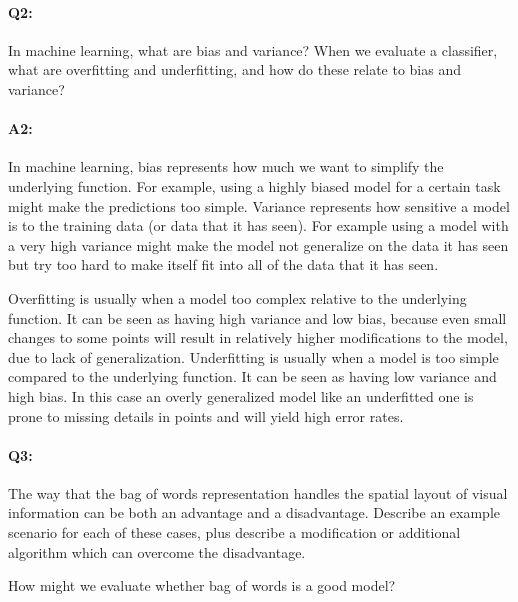 
\pagebreak
\paragraph{Q2:} In machine learning, what are bias and variance? When we evaluate a classifier, what are overfitting and underfitting, and how do these relate to bias and variance?

\paragraph{A2:} In machine learning, bias represents how much we want to simplify the underlying function. For example, using a highly biased model for a certain task might make the predictions too simple. Variance represents how sensitive a model is to the training data (or data that it has seen). For example using a model with a very high variance might make the model not generalize on the data it has seen but try too hard to make itself fit into all of the data that it has seen.

Overfitting is usually when a model too complex relative to the underlying function. It can be seen as having high variance and low bias, because even small changes to some points will result in relatively higher modifications to the model, due to lack of generalization. Underfitting is usually when a model is too simple compared to the underlying function. It can be seen as having low variance and high bias. In this case an overly generalized model like an underfitted one is prone to missing details in points and will yield high error rates.


\pagebreak
\paragraph{Q3:} The way that the bag of words representation handles the spatial layout of visual information can be both an advantage and a disadvantage. Describe an example scenario for each of these cases, plus describe a modification or additional algorithm which can overcome the disadvantage.

How might we evaluate whether bag of words is a good model?


